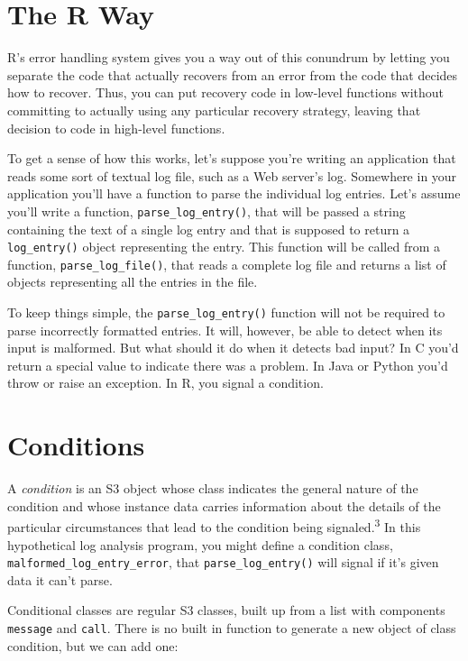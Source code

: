 \section{The R Way}

R's error handling system gives you a way out of this conundrum by
letting you separate the code that actually recovers from an error from
the code that decides how to recover. Thus, you can put recovery code in
low-level functions without committing to actually using any particular
recovery strategy, leaving that decision to code in high-level
functions.

To get a sense of how this works, let's suppose you're writing an
application that reads some sort of textual log file, such as a Web
server's log. Somewhere in your application you'll have a function to
parse the individual log entries. Let's assume you'll write a function,
\texttt{parse\_log\_entry()}, that will be passed a string containing
the text of a single log entry and that is supposed to return a
\texttt{log\_entry()} object representing the entry. This function will
be called from a function, \texttt{parse\_log\_file()}, that reads a
complete log file and returns a list of objects representing all the
entries in the file.

To keep things simple, the \texttt{parse\_log\_entry()} function will
not be required to parse incorrectly formatted entries. It will,
however, be able to detect when its input is malformed. But what should
it do when it detects bad input? In C you'd return a special value to
indicate there was a problem. In Java or Python you'd throw or raise an
exception. In R, you signal a condition.

\section{Conditions}

A \emph{condition} is an S3 object whose class indicates the general
nature of the condition and whose instance data carries information
about the details of the particular circumstances that lead to the
condition being signaled.\textsuperscript{3} In this hypothetical log
analysis program, you might define a condition class,
\texttt{malformed\_log\_entry\_error}, that \texttt{parse\_log\_entry()}
will signal if it's given data it can't parse.

Conditional classes are regular S3 classes, built up from a list with
components \texttt{message} and \texttt{call}. There is no built in
function to generate a new object of class condition, but we can add
one:

